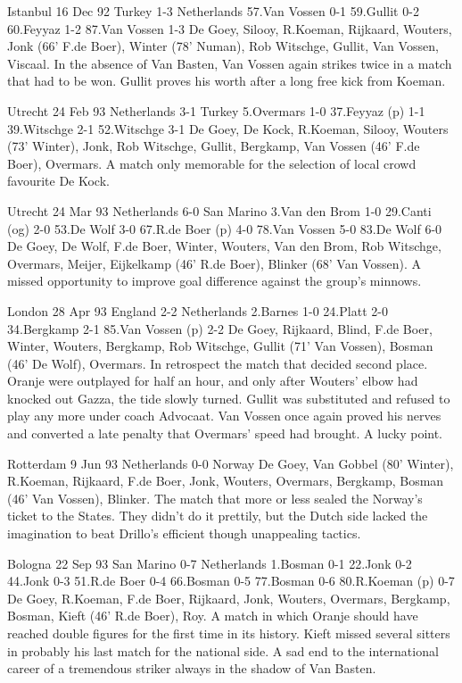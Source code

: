 Istanbul     16 Dec 92        Turkey      1-3 Netherlands
        57.Van Vossen 0-1 59.Gullit 0-2 60.Feyyaz 1-2 87.Van Vossen 1-3
     De Goey, Silooy, R.Koeman, Rijkaard, Wouters, Jonk (66' F.de Boer),
     Winter (78' Numan), Rob Witschge, Gullit, Van Vossen, Viscaal.
In the absence of Van Basten, Van Vossen again strikes twice in a match that
 had to be won.  Gullit proves his worth after a long free kick from Koeman.

Utrecht      24 Feb 93        Netherlands 3-1 Turkey
        5.Overmars 1-0 37.Feyyaz (p) 1-1 39.Witschge 2-1 52.Witschge 3-1
     De Goey, De Kock, R.Koeman, Silooy, Wouters (73' Winter), Jonk,
     Rob Witschge, Gullit, Bergkamp, Van Vossen (46' F.de Boer), Overmars.
A match only memorable for the selection of local crowd favourite De Kock.
    
Utrecht      24 Mar 93        Netherlands 6-0 San Marino
        3.Van den Brom 1-0 29.Canti (og) 2-0 53.De Wolf 3-0
        67.R.de Boer (p) 4-0 78.Van Vossen 5-0 83.De Wolf 6-0
     De Goey, De Wolf, F.de Boer, Winter, Wouters, Van den Brom, Rob Witschge,
     Overmars, Meijer, Eijkelkamp (46' R.de Boer), Blinker (68' Van Vossen).
A missed opportunity to improve goal difference against the group's minnows.

London       28 Apr 93        England     2-2 Netherlands
        2.Barnes 1-0 24.Platt 2-0 34.Bergkamp 2-1 85.Van Vossen (p) 2-2
     De Goey, Rijkaard, Blind, F.de Boer, Winter, Wouters, Bergkamp,
     Rob Witschge, Gullit (71' Van Vossen), Bosman (46' De Wolf), Overmars.
In retrospect the match that decided second place.  Oranje were outplayed
 for half an hour, and only after Wouters' elbow had knocked out Gazza, the
 tide slowly turned.  Gullit was substituted and refused to play any more
 under coach Advocaat.  Van Vossen once again proved his nerves and converted
 a late penalty that Overmars' speed had brought.  A lucky point.

Rotterdam     9 Jun 93        Netherlands 0-0 Norway
     De Goey, Van Gobbel (80' Winter), R.Koeman, Rijkaard, F.de Boer, Jonk,
     Wouters, Overmars, Bergkamp, Bosman (46' Van Vossen), Blinker.
The match that more or less sealed the Norway's ticket to the States.  They
 didn't do it prettily, but the Dutch side lacked the imagination to beat
 Drillo's efficient though unappealing tactics.

Bologna      22 Sep 93        San Marino  0-7 Netherlands
        1.Bosman 0-1 22.Jonk 0-2 44.Jonk 0-3 51.R.de Boer 0-4 66.Bosman 0-5
        77.Bosman 0-6 80.R.Koeman (p) 0-7
      De Goey, R.Koeman, F.de Boer, Rijkaard, Jonk, Wouters, Overmars, 
      Bergkamp, Bosman, Kieft (46' R.de Boer), Roy.
A match in which Oranje should have reached double figures for the first time
 in its history.  Kieft missed several sitters in probably his last match for
 the national side.  A sad end to the international career of a tremendous
 striker always in the shadow of Van Basten.

